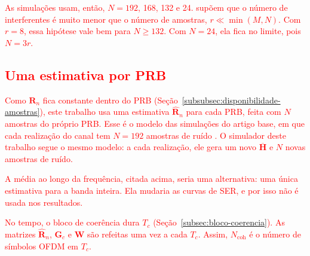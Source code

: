 \textcolor{red}{As simulações usam, então, $N = 192$, 168, 132 e 24.  supõem que o número de interferentes é muito menor que o número de amostras, $r \ll \min(M, N)$. Com $r = 8$, essa hipótese vale bem para $N \ge 132$. Com $N = 24$, ela fica no limite, pois $N = 3r$.}


\subsection{\texorpdfstring{\textcolor{red}{Uma estimativa por PRB}}{Uma estimativa por PRB}}\label{subsec:estimativa-prb}


\textcolor{red}{Como $\mathbf{R}_n$ fica constante dentro do PRB (Seção~\ref{subsubsec:disponibilidade-amostras}), este trabalho usa uma estimativa $\hat{\mathbf{R}}_n$ para cada PRB, feita com $N$ amostras do próprio PRB. Esse é o modelo das simulações do artigo base, em que cada realização do canal tem $N = 192$ amostras de ruído \cite{zhao2025jsac}. O simulador deste trabalho segue o mesmo modelo: a cada realização, ele gera um novo $\overline{\mathbf{H}}$ e $N$ novas amostras de ruído.}

\textcolor{red}{A média ao longo da frequência, citada acima, seria uma alternativa: uma única estimativa para a banda inteira. Ela mudaria as curvas de SER, e por isso não é usada nos resultados.}

\textcolor{red}{No tempo, o bloco de coerência dura $T_c$ (Seção~\ref{subsec:bloco-coerencia}). As matrizes $\hat{\mathbf{R}}_n$, $\mathbf{G}_c$ e $\mathbf{W}$ são refeitas uma vez a cada $T_c$. Assim, $N_{\text{coh}}$ é o número de símbolos OFDM em $T_c$.}

